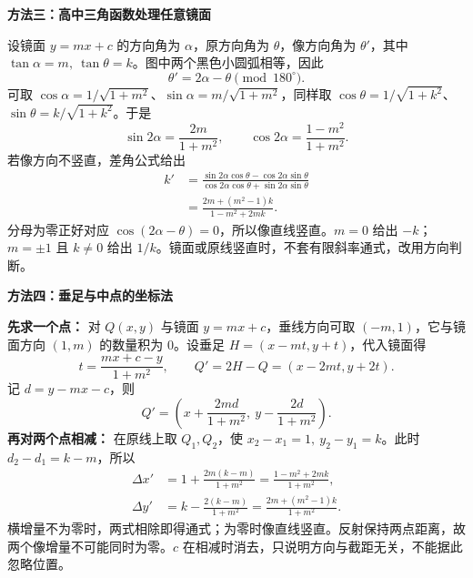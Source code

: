 \clearpage
\begin{proofbox}
\textbf{方法三：高中三角函数处理任意镜面}
\begin{center}

\end{center}
设镜面 $y=mx+c$ 的方向角为 $\alpha$，原方向角为 $\theta$，像方向角为 $\theta'$，其中 $\tan\alpha=m,\ \tan\theta=k$。图中两个黑色小圆弧相等，因此
\[
\theta'=2\alpha-\theta\pmod{180^\circ}.
\]
可取 $\cos\alpha=1/\sqrt{1+m^2}$、$\sin\alpha=m/\sqrt{1+m^2}$，同样取 $\cos\theta=1/\sqrt{1+k^2}$、$\sin\theta=k/\sqrt{1+k^2}$。于是
\[
\sin2\alpha=\frac{2m}{1+m^2},\qquad
\cos2\alpha=\frac{1-m^2}{1+m^2}.
\]
若像方向不竖直，差角公式给出
\[
\begin{aligned}
k'&=\frac{\sin2\alpha\cos\theta-\cos2\alpha\sin\theta}
{\cos2\alpha\cos\theta+\sin2\alpha\sin\theta}\\[3pt]
&=\boxed{\frac{2m+(m^2-1)k}{1-m^2+2mk}}.
\end{aligned}
\]
分母为零正好对应 $\cos(2\alpha-\theta)=0$，所以像直线竖直。$m=0$ 给出 $-k$；$m=\pm1$ 且 $k\ne0$ 给出 $1/k$。镜面或原线竖直时，不套有限斜率通式，改用方向判断。
\end{proofbox}

\clearpage
\begin{proofbox}
\textbf{方法四：垂足与中点的坐标法}
\begin{center}

\end{center}
\textbf{先求一个点：} 对 $Q(x,y)$ 与镜面 $y=mx+c$，垂线方向可取 $(-m,1)$，它与镜面方向 $(1,m)$ 的数量积为 $0$。设垂足 $H=(x-mt,y+t)$，代入镜面得
\[
t=\frac{mx+c-y}{1+m^2},\qquad Q'=2H-Q=(x-2mt,y+2t).
\]
记 $d=y-mx-c$，则
\[
Q'=\left(x+\frac{2md}{1+m^2},\ y-\frac{2d}{1+m^2}\right).
\]
\textbf{再对两个点相减：} 在原线上取 $Q_1,Q_2$，使 $x_2-x_1=1,\ y_2-y_1=k$。此时 $d_2-d_1=k-m$，所以
\[
\begin{aligned}
\Delta x'&=1+\frac{2m(k-m)}{1+m^2}=\frac{1-m^2+2mk}{1+m^2},\\
\Delta y'&=k-\frac{2(k-m)}{1+m^2}=\frac{2m+(m^2-1)k}{1+m^2}.
\end{aligned}
\]
横增量不为零时，两式相除即得通式；为零时像直线竖直。反射保持两点距离，故两个像增量不可能同时为零。$c$ 在相减时消去，只说明方向与截距无关，不能据此忽略位置。
\end{proofbox}
